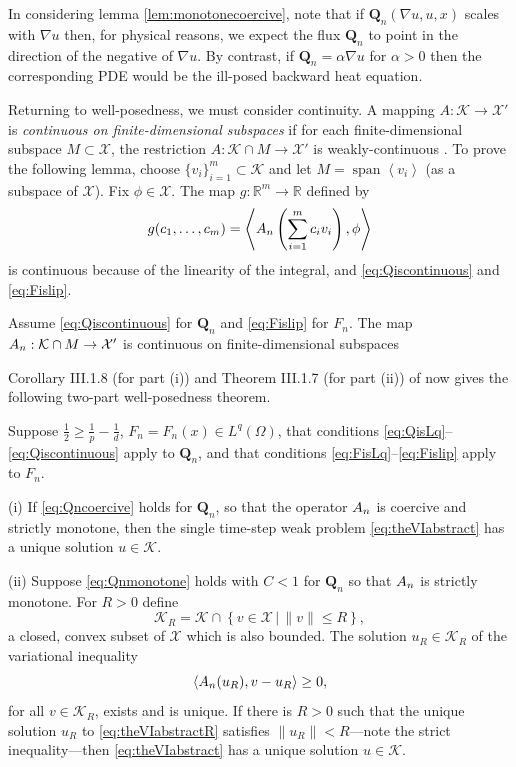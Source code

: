 \documentclass[final,leqno,onefignum,onetabnum]{siamltex1213bueler}
\newcommand\bQ{\mathbf{Q}}
\renewcommand{\grad}{\nabla}
\newcommand{\ip}[2]{\ensuremath{\left<#1,#2\right>}}
\newcommand\RR{\mathbb{R}}
\begin{document}
In considering lemma \eqref{lem:monotonecoercive}, note that if $\bQ_n(\grad u,u,x)$ scales with $\grad u$ then, for physical reasons, we expect the flux $\bQ_n$ to point in the direction of the negative of $\grad u$.  By contrast, if $\bQ_n = \alpha \grad u$ for $\alpha>0$ then the corresponding PDE would be the ill-posed backward heat equation.

Returning to well-posedness, we must consider continuity.  A mapping $A : \mathcal{K} \to \mathcal{X}'$ is \emph{continuous on finite-dimensional subspaces} if for each finite-dimensional subspace $M\subset \mathcal{X}$, the restriction $A : \mathcal{K}\cap M \to \mathcal{X}'$ is weakly-continuous \cite{KinderlehrerStampacchia}.  To prove the following lemma, choose $\{v_i\}_{i=1}^m \subset \mathcal{K}$ and let $M=\operatorname{span}\left<v_i\right>$ (as a subspace of $\mathcal{X}$).  Fix $\phi\in\mathcal{X}$.  The map $g:\RR^m \to \RR$ defined by
\begin{equation}
  g(c_1,\dots,c_m) = \ip{\An\left(\sum_{i=1}^m c_i v_i\right)}{\phi}
\end{equation}
is continuous because of the linearity of the integral, and \eqref{eq:Qiscontinuous} and \eqref{eq:Fislip}.

\medskip
\begin{lemma}  \label{lem:continuous}  Assume \eqref{eq:Qiscontinuous} for $\bQ_n$ and \eqref{eq:Fislip} for $F_n$.  The map $A_{n} : \mathcal{K}\cap M \to \mathcal{X}'$ is continuous on finite-dimensional subspaces
\end{lemma}

\medskip
Corollary III.1.8 (for part (i)) and Theorem III.1.7 (for part (ii)) of \cite{KinderlehrerStampacchia} now gives the following two-part well-posedness theorem.

\begin{theorem}  \label{thm:firstwellposed}  Suppose $\frac{1}{2} \ge \frac{1}{p} - \frac{1}{d}$, $F_n=F_n(x)\in L^q(\Omega)$, that conditions \eqref{eq:QisLq}--\eqref{eq:Qiscontinuous} apply to $\bQ_n$, and that conditions \eqref{eq:FisLq}--\eqref{eq:Fislip} apply to $F_n$.

(i)  If \eqref{eq:Qncoercive} holds for $\bQ_n$, so that the operator $A_{n}$ is coercive and strictly monotone, then the single time-step weak problem \eqref{eq:theVIabstract} has a unique solution $u\in\mathcal{K}$.

(ii) Suppose \eqref{eq:Qnmonotone} holds with $C<1$ for $\bQ_n$ so that $A_{n}$ is strictly monotone.  For $R>0$ define
    $$\mathcal{K}_R = \mathcal{K} \cap \left\{v\in \mathcal{X} \,\Big|\, \|v\|\le R\right\},$$
a closed, convex subset of $\mathcal{X}$ which is also bounded.  The solution $u_R\in \mathcal{K}_R$ of the variational inequality
\begin{equation}
  \ip{\An(u_R)}{v-u_R} \ge 0, \label{eq:theVIabstractR}
\end{equation}
for all $v \in \mathcal{K}_R$, exists and is unique.  If there is $R>0$ such that the unique solution $u_R$ to \eqref{eq:theVIabstractR} satisfies $\|u_R\| < R$---note the strict inequality---then \eqref{eq:theVIabstract} has a unique solution $u\in\mathcal{K}$.
\end{theorem}
\end{document}
